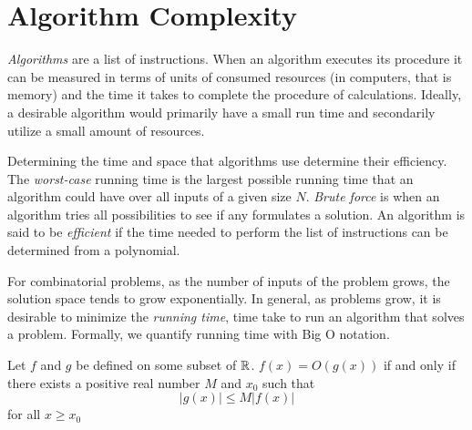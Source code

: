 \section{Algorithm Complexity}
\textit{Algorithms} are a list of instructions.  
When an algorithm executes its procedure it can be measured in terms of units of consumed resources (in computers, that is memory) and the time it takes to complete the procedure of calculations.  
Ideally, a desirable algorithm would primarily have a small run time and secondarily utilize a small amount of resources.

Determining the time and space that algorithms use determine their efficiency.  
The \textit{worst-case} running time is the largest possible running time that an algorithm could have over all inputs of a given size $N$.  
\textit{Brute force} is when an algorithm tries all possibilities to see if any formulates a solution.  
An algorithm is said to be \textit{efficient} if the time needed to perform the list of instructions can be determined from a polynomial. %

For combinatorial problems, as the number of inputs of the problem grows, the solution space tends to grow exponentially.  
In general, as problems grow, it is desirable to minimize the \textit{running time}, time take to run an algorithm that solves a problem. 
Formally, we quantify running time with Big O notation.
\begin{definition}
Let $f$ and $g$ be defined on some subset of ${\mathbb{R}}$.  
$f(x) = O\left(g(x)\right)$ if and only if there exists a positive real number $M$ and $x_0$ such that $$\left\vert g(x)\right\vert \leq M \left\vert f(x) \right\vert$$
for all $x \geq x_0$
\end{definition}


